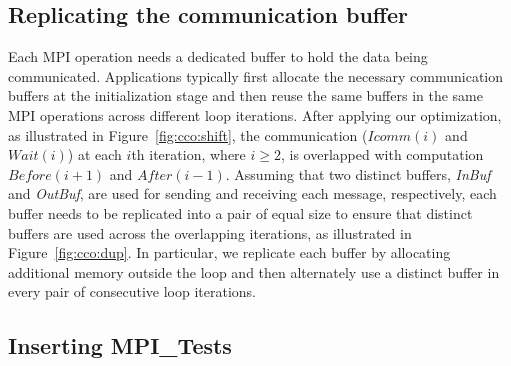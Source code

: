 \subsection{Replicating the communication buffer}
Each MPI operation needs a dedicated buffer to hold the data being communicated.
Applications typically first allocate the necessary communication buffers at the initialization stage and then reuse
the same buffers in the same MPI operations across different loop iterations.
After applying our optimization, as illustrated in Figure~\ref{fig:cco:shift},
  the communication ($Icomm(i)$ and $Wait(i)$) at each $i$th iteration, where $i \geq 2$,  is overlapped with computation $Before(i+1)$ and $After(i-1)$.
  Assuming that two distinct buffers, {\em InBuf} and {\em OutBuf}, are used for sending and receiving each message, respectively, 
 each buffer needs to be replicated into a pair of equal size to ensure that distinct buffers are used across the overlapping iterations, 
as illustrated in Figure~\ref{fig:cco:dup}.
In particular, we replicate each buffer
  by allocating additional memory outside the loop %
  and then alternately use a distinct buffer in every pair of consecutive loop iterations.


\subsection{Inserting MPI\_Tests}
%
%
%

